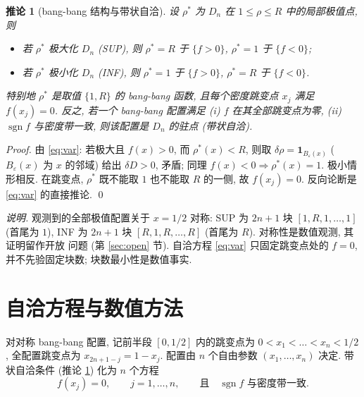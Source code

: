 \documentclass[UTF8]{ctexart}
\newtheorem{corollary}[theorem]{推论}
\begin{document}
\begin{corollary}[bang-bang 结构与带状自洽]\label{cor:bang}
	设 $\rho^*$ 为 $D_n$ 在 $1 \leq \rho \leq R$ 中的局部极值点, 则
	\begin{itemize}
		\item 若 $\rho^*$ 极大化 $D_n$ (SUP), 则
			$\rho^* = R$ 于 $\{f > 0\}$, $\rho^* = 1$ 于 $\{f < 0\}$;
		\item 若 $\rho^*$ 极小化 $D_n$ (INF), 则
			$\rho^* = 1$ 于 $\{f > 0\}$, $\rho^* = R$ 于 $\{f < 0\}$.
	\end{itemize}
	特别地 $\rho^*$ 是取值 $\{1, R\}$ 的 bang-bang 函数, 且每个密度跳变点
	$x_j$ 满足 $f(x_j) = 0$. 反之, 若一个 bang-bang 配置满足
	(i) $f$ 在其全部跳变点为零, (ii) $\operatorname{sgn} f$ 与密度带一致,
	则该配置是 $D_n$ 的驻点 (带状自洽).
\end{corollary}

\begin{proof}
	由 \eqref{eq:var}: 若极大且 $f(x) > 0$, 而 $\rho^*(x) < R$,
	则取 $\delta\rho = \mathbf{1}_{B_\varepsilon(x)}$ ($B_\varepsilon(x)$ 为
	$x$ 的邻域) 给出 $\delta D > 0$, 矛盾; 同理 $f(x) < 0 \Rightarrow
	\rho^*(x) = 1$. 极小情形相反. 在跳变点, $\rho^*$ 既不能取 $1$ 也不能取
	$R$ 的一侧, 故 $f(x_j) = 0$. 反向论断是 \eqref{eq:var} 的直接推论.
	\qed
\end{proof}

\emph{说明.} 观测到的全部极值配置关于 $x = 1/2$ 对称: SUP 为
$2n+1$ 块 $[1, R, 1, \dots, 1]$ (首尾为 $1$), INF 为 $2n+1$ 块
$[R, 1, R, \dots, R]$ (首尾为 $R$). 对称性是数值观测, 其证明留作开放
问题 (第 \ref{sec:open} 节). 自洽方程 \eqref{eq:var} 只固定跳变点处的
$f = 0$, 并不先验固定块数; 块数最小性是数值事实.

\section{自洽方程与数值方法}\label{sec:method}

对对称 bang-bang 配置, 记前半段 $[0, 1/2]$ 内的跳变点为
$0 < x_1 < \dots < x_n < 1/2$, 全配置跳变点为
$x_{2n+1-j} = 1 - x_j$. 配置由 $n$ 个自由参数 $(x_1, \dots, x_n)$ 决定.
带状自洽条件 (推论 \ref{cor:bang}) 化为 $n$ 个方程
\begin{equation}\label{eq:sc}
	f(x_j) = 0, \qquad j = 1, \dots, n,
	\qquad \text{且}\quad \operatorname{sgn} f
	\text{ 与密度带一致}.
\end{equation}
\end{document}
